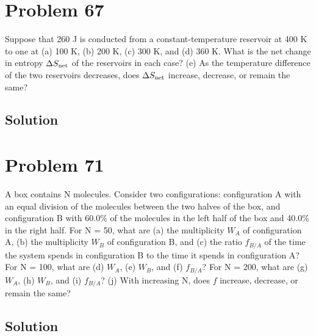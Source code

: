 \documentclass[12pt]{article}
\begin{document}
    \section{Problem 67}
        Suppose that 260 J is conducted from a constant-temperature reservoir at 400 K to one at (a) 100 K, (b) 200 K, (c) 300 K, and (d) 360 K. 
        What is the net change in entropy $\Delta S_{\rm net}$ of the reservoirs in each case? 
        (e) As the temperature difference of the two reservoirs decreases, does $\Delta S_{\rm net}$ increase, decrease, or remain the same?

        \subsection{Solution}

    \section{Problem 71}
        A box contains N molecules. 
        Consider two configurations: configuration A with an equal division of the molecules between the two halves of the box, and configuration B with 60.0\% of the molecules in the left half of the box and 40.0\% in the right half. 
        For N = 50, what are (a) the multiplicity $W_A$ of configuration A, (b) the multiplicity $W_B$ of configuration B, and (c) the ratio $f_{B/A}$ of the time the system spends in configuration B to the time it spends in configuration A? 
        For N = 100, what are (d) $W_A$, (e) $W_B$, and (f) $f_{B/A}$? 
        For N = 200, what are (g) $W_A$, (h) $W_B$, and (i) $f_{B/A}$? 
        (j) With increasing N, does $f$ increase, decrease, or remain the same?

        \subsection{Solution}

    \pagebreak

    \tableofcontents
\end{document}
